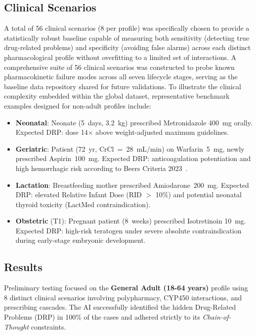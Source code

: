 \documentclass[9pt,conference]{IEEEtran}
\begin{document}
\subsection{Clinical Scenarios}

A total of 56 clinical scenarios (8 per profile) was specifically chosen to provide a statistically robust baseline capable of measuring both sensitivity (detecting true drug-related problems) and specificity (avoiding false alarms) across each distinct pharmacological profile without overfitting to a limited set of interactions. A comprehensive suite of 56 clinical scenarios was constructed to probe known pharmacokinetic failure modes across all seven lifecycle stages, serving as the baseline data repository shared for future validations. To illustrate the clinical complexity embedded within the global dataset, representative benchmark examples designed for non-adult profiles include:

\begin{itemize}
  \item \textbf{Neonatal}: Neonate (5~days, 3.2~kg) prescribed Metronidazole 400~mg orally. Expected DRP: dose 14$\times$ above weight-adjusted maximum guidelines.
  \item \textbf{Geriatric}: Patient (72~yr, CrCl~=~28~mL/min) on Warfarin~5~mg, newly prescribed Aspirin~100~mg. Expected DRP: anticoagulation potentiation and high hemorrhagic risk according to Beers Criteria 2023~\cite{samuel20232023}.
  \item \textbf{Lactation}: Breastfeeding mother prescribed Amiodarone~200~mg. Expected DRP: elevated Relative Infant Dose (RID $>$ 10\%) and potential neonatal thyroid toxicity (LactMed contraindication).
  \item \textbf{Obstetric} (T1): Pregnant patient (8~weeks) prescribed Isotretinoin 10~mg. Expected DRP: high-risk teratogen under severe absolute contraindication during early-stage embryonic development.
\end{itemize}

\subsection{Results}

Preliminary testing focused on the \textbf{General Adult (18-64 years)} profile using 8 distinct clinical scenarios involving polypharmacy, CYP450 interactions, and prescribing cascades. The AI successfully identified the hidden Drug-Related Problems (DRP) in 100\% of the cases and adhered strictly to its \textit{Chain-of-Thought} constraints.
\end{document}
